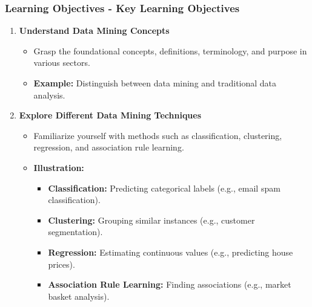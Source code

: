 \documentclass[aspectratio=169]{beamer}
\begin{document}
\begin{frame}[fragile]
    \frametitle{Learning Objectives - Key Learning Objectives}
    \begin{enumerate}
        \item \textbf{Understand Data Mining Concepts}
            \begin{itemize}
                \item Grasp the foundational concepts, definitions, terminology, and purpose in various sectors.
                \item \textbf{Example:} Distinguish between data mining and traditional data analysis.
            \end{itemize}
        
        \item \textbf{Explore Different Data Mining Techniques}
            \begin{itemize}
                \item Familiarize yourself with methods such as classification, clustering, regression, and association rule learning.
                \item \textbf{Illustration:}
                \begin{itemize}
                    \item \textbf{Classification:} Predicting categorical labels (e.g., email spam classification).
                    \item \textbf{Clustering:} Grouping similar instances (e.g., customer segmentation).
                    \item \textbf{Regression:} Estimating continuous values (e.g., predicting house prices).
                    \item \textbf{Association Rule Learning:} Finding associations (e.g., market basket analysis).
                \end{itemize}
            \end{itemize}
    \end{enumerate}
\end{frame}
\end{document}
